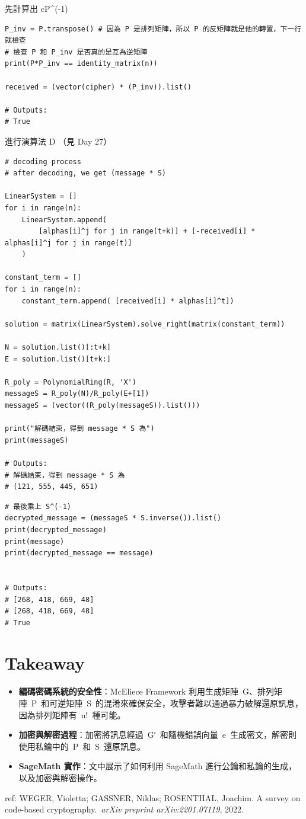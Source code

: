 \documentclass[
]{article}
\providecommand{\tightlist}{%
  \setlength{\itemsep}{0pt}\setlength{\parskip}{0pt}}
\begin{document}
先計算出 cP\^{}(-1)

\begin{verbatim}
P_inv = P.transpose() # 因為 P 是排列矩陣，所以 P 的反矩陣就是他的轉置，下一行就檢查
# 檢查 P 和 P_inv 是否真的是互為逆矩陣
print(P*P_inv == identity_matrix(n)) 

received = (vector(cipher) * (P_inv)).list()

# Outputs:
# True
\end{verbatim}

進行演算法 D （見 Day 27）

\begin{verbatim}
# decoding process
# after decoding, we get (message * S)

LinearSystem = [] 
for i in range(n):
    LinearSystem.append(
        [alphas[i]^j for j in range(t+k)] + [-received[i] * alphas[i]^j for j in range(t)]
    )

constant_term = []
for i in range(n):
    constant_term.append( [received[i] * alphas[i]^t])

solution = matrix(LinearSystem).solve_right(matrix(constant_term))

N = solution.list()[:t+k]
E = solution.list()[t+k:]

R_poly = PolynomialRing(R, 'X')
messageS = R_poly(N)/R_poly(E+[1])
messageS = (vector((R_poly(messageS)).list()))

print("解碼結束，得到 message * S 為")
print(messageS)

# Outputs:
# 解碼結束，得到 message * S 為
# (121, 555, 445, 651)
\end{verbatim}

\begin{verbatim}
# 最後乘上 S^(-1)
decrypted_message = (messageS * S.inverse()).list()
print(decrypted_message)
print(message)
print(decrypted_message == message)


# Outputs:
# [268, 418, 669, 48]
# [268, 418, 669, 48]
# True
\end{verbatim}

\hypertarget{takeaway}{%
\section{Takeaway}\label{takeaway}}

\begin{itemize}
\tightlist
\item
  \textbf{編碼密碼系統的安全性}：McEliece Framework
  利用生成矩陣~G、排列矩陣~P~和可逆矩陣~S~的混淆來確保安全，攻擊者難以通過暴力破解還原訊息，因為排列矩陣有~n!~種可能。
\item
  \textbf{加密與解密過程}：加密將訊息經過~G′~和隨機錯誤向量~e~生成密文，解密則使用私鑰中的~P~和~S~還原訊息。
\item
  \textbf{SageMath 實作}：文中展示了如何利用 SageMath
  進行公鑰和私鑰的生成，以及加密與解密操作。
\end{itemize}

ref: WEGER, Violetta; GASSNER, Niklas; ROSENTHAL, Joachim. A survey on
code-based cryptography.~\emph{arXiv preprint arXiv:2201.07119}, 2022.
\end{document}
